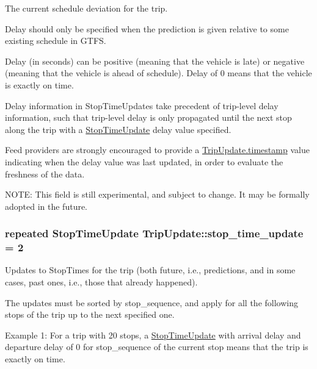 The current schedule deviation for the trip. 

Delay should only be specified when the prediction is given relative to some existing schedule in G\+T\+FS.

Delay (in seconds) can be positive (meaning that the vehicle is late) or negative (meaning that the vehicle is ahead of schedule). Delay of 0 means that the vehicle is exactly on time.

Delay information in Stop\+Time\+Updates take precedent of trip-\/level delay information, such that trip-\/level delay is only propagated until the next stop along the trip with a \hyperlink{structTripUpdate_1_1StopTimeUpdate}{Stop\+Time\+Update} delay value specified.

Feed providers are strongly encouraged to provide a \hyperlink{structTripUpdate_a9c5a10025b4a68a78c3c0f0579186ea4}{Trip\+Update.\+timestamp} value indicating when the delay value was last updated, in order to evaluate the freshness of the data.

N\+O\+TE\+: This field is still experimental, and subject to change. It may be formally adopted in the future. 
\subsubsection[{\texorpdfstring{stop\+\_\+time\+\_\+update}{stop_time_update}}]{\setlength{\rightskip}{0pt plus 5cm}repeated {\bf Stop\+Time\+Update} Trip\+Update\+::stop\+\_\+time\+\_\+update = 2}\hypertarget{structTripUpdate_a2bfd408c9bcb02945e07162f91cf012f}{}\label{structTripUpdate_a2bfd408c9bcb02945e07162f91cf012f}


Updates to Stop\+Times for the trip (both future, i.\+e., predictions, and in some cases, past ones, i.\+e., those that already happened). 

The updates must be sorted by stop\+\_\+sequence, and apply for all the following stops of the trip up to the next specified one.

Example 1\+: For a trip with 20 stops, a \hyperlink{structTripUpdate_1_1StopTimeUpdate}{Stop\+Time\+Update} with arrival delay and departure delay of 0 for stop\+\_\+sequence of the current stop means that the trip is exactly on time.

